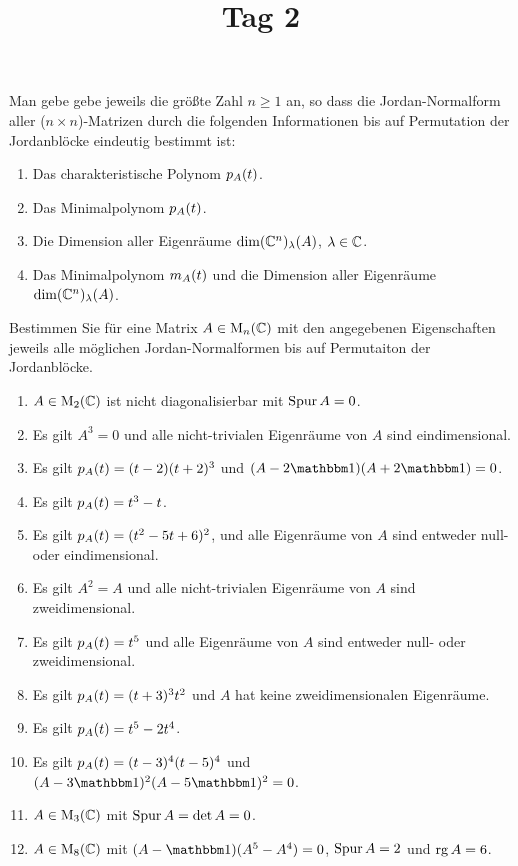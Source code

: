\documentclass[a4paper, 10pt]{scrartcl}
\title{Tag 2}
\author{}
\date{}
\begin{document}
\begin{question}
  Man gebe gebe jeweils die größte Zahl $n \geq 1$ an, so dass die Jordan-Normalform aller ($n \times n$)-Matrizen durch die folgenden Informationen bis auf Permutation der Jordanblöcke eindeutig bestimmt ist:
  \begin{enumerate}
    \item
      Das charakteristische Polynom $p_{A}(t)$.
    \item
      Das Minimalpolynom $p_{A}(t)$.
    \item
      Die Dimension aller Eigenräume $\dim (\mathbb{C}^n)_{\lambda}(A)$, $\lambda \in \mathbb{C}$.
    \item
      Das Minimalpolynom $m_{A}(t)$ und die Dimension aller Eigenräume $\dim (\mathbb{C}^n)_{\lambda}(A)$.
  \end{enumerate}
\end{question}





\begin{question}
  Bestimmen Sie für eine Matrix $A \in \operatorname{M}_{n}(\mathbb{C})$ mit den angegebenen Eigenschaften jeweils alle möglichen Jordan-Normalformen bis auf Permutaiton der Jordanblöcke.
  \begin{enumerate}
    \item
      $A\in \operatorname{M}_{2}(\mathbb{C})$ ist nicht diagonalisierbar mit $\operatorname{Spur} A = 0$.
    \item
      Es gilt $A^3 = 0$ und alle nicht-trivialen Eigenräume von $A$ sind eindimensional.
    \item
      Es gilt $p_{A}(t) = (t-2)(t+2)^3$ und $(A - 2 \Id)(A + 2 \Id) = 0$.
    \item
      Es gilt $p_{A}(t) = t^3 - t$.
    \item
      Es gilt $p_{A}(t) = (t^2 - 5t + 6)^2$, und alle Eigenräume von $A$ sind entweder null- oder eindimensional.
    \item
      Es gilt $A^2 = A$ und alle nicht-trivialen Eigenräume von $A$ sind zweidimensional.
    \item
      Es gilt $p_{A}(t) = t^5$ und alle Eigenräume von $A$ sind entweder null- oder zweidimensional.
    \item
      Es gilt $p_{A}(t) = (t + 3)^3 t^2$ und $A$ hat keine zweidimensionalen Eigenräume.
    \item
      Es gilt $p_{A}(t) = t^5 -2 t^4$.
    \item
      Es gilt $p_{A}(t) = (t-3)^4 (t-5)^4$ und $(A - 3 \Id)^2 (A - 5 \Id)^2 = 0$.
    \item
      $A \in \operatorname{M}_{3}(\mathbb{C})$ mit $\operatorname{Spur} A = \det A = 0$.
    \item
      $A \in \operatorname{M}_{8}(\mathbb{C})$ mit $(A - \Id)(A^5 - A^4) = 0$, $\operatorname{Spur} A = 2$ und $\operatorname{rg} A = 6$.
  \end{enumerate}
\end{question}
\end{document}
